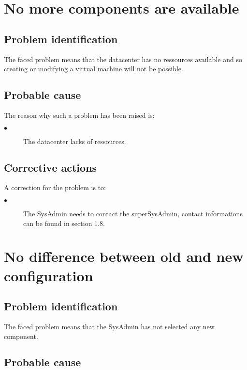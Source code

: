 \section{No more components are available} 

\subsection{Problem identification}
The faced problem means that the datacenter has no ressources available and so
creating or modifying a virtual machine will not be possible.

\subsection{Probable cause}

The reason why such a problem has been raised is:\\
\begin{description}
\item[$\bullet$] The datacenter lacks of ressources.
\end{description}


\subsection{Corrective actions}

A correction for the problem is to:\\
\begin{description}
\item[$\bullet$] The SysAdmin needs to contact the superSysAdmin, contact
informations can be found in section 1.8.

\end{description}







\section{No difference between old and new configuration} 

\subsection{Problem identification}
The faced problem means that the SysAdmin has not selected any new component.

\subsection{Probable cause}

